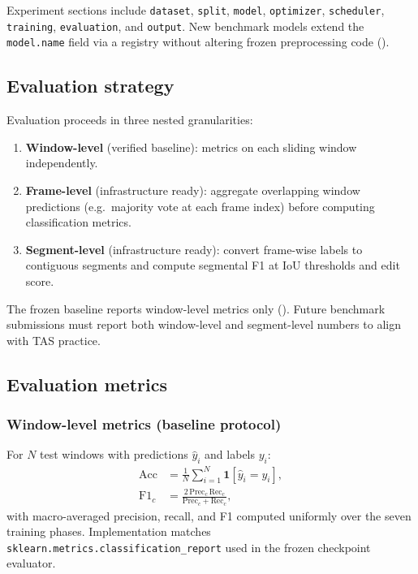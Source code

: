 Experiment sections include \texttt{dataset}, \texttt{split}, \texttt{model}, \texttt{optimizer}, \texttt{scheduler}, \texttt{training}, \texttt{evaluation}, and \texttt{output}.
New benchmark models extend the \texttt{model.name} field via a registry without altering frozen preprocessing code ().

\subsection{Evaluation strategy}
\label{sec:protocol:eval_strategy}

Evaluation proceeds in three nested granularities:
\begin{enumerate}
  \item \textbf{Window-level} (verified baseline): metrics on each sliding window independently.
  \item \textbf{Frame-level} (infrastructure ready): aggregate overlapping window predictions (e.g.\ majority vote at each frame index) before computing classification metrics.
  \item \textbf{Segment-level} (infrastructure ready): convert frame-wise labels to contiguous segments and compute segmental F1 at IoU thresholds and edit score.
\end{enumerate}

The frozen baseline reports window-level metrics only ().
Future benchmark submissions must report both window-level and segment-level numbers to align with \acs{TAS} practice.

\subsection{Evaluation metrics}
\label{sec:protocol:metrics}

\subsubsection{Window-level metrics (baseline protocol)}
\label{sec:protocol:metrics:window}

For $N$ test windows with predictions $\hat{y}_i$ and labels $y_i$:
\begin{align}
  \mathrm{Acc} &= \frac{1}{N}\sum_{i=1}^{N} \mathbf{1}[\hat{y}_i = y_i], \\
  \mathrm{F1}_c &= \frac{2\,\mathrm{Prec}_c\,\mathrm{Rec}_c}{\mathrm{Prec}_c + \mathrm{Rec}_c},
\end{align}
with macro-averaged precision, recall, and F1 computed uniformly over the seven training phases.
Implementation matches \texttt{sklearn.metrics.classification\_report} used in the frozen checkpoint evaluator.

